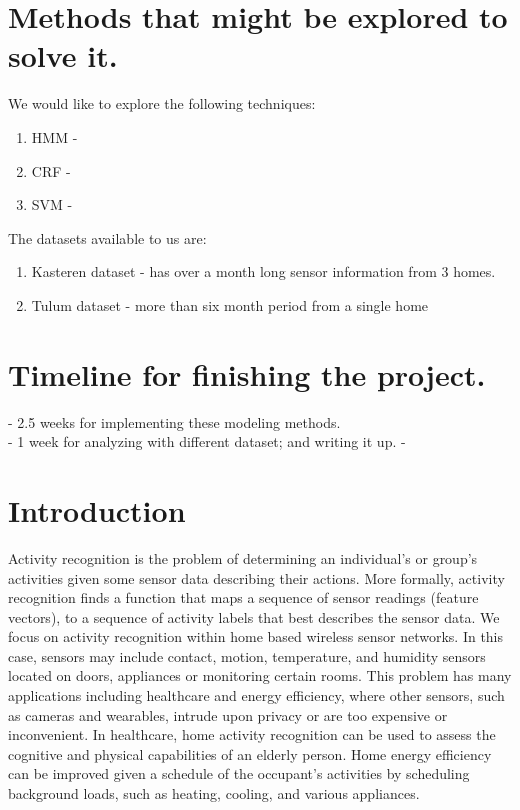 \documentclass[11pt, oneside]{article}   	%
\begin{document}
\section{Methods that might be explored to solve it. }
We would like to explore the following techniques:
	\begin{enumerate}
\item HMM - 
\item CRF - 
\item SVM - 
	\end{enumerate}
	
The datasets available to us are:
	\begin{enumerate}
\item Kasteren dataset - has over a month long sensor information from 3 homes.
\item Tulum dataset - more than six month period from a single home
	\end{enumerate}
\section{ Timeline for finishing the project. }
 - 2.5 weeks for implementing these modeling methods. \\
 - 1 week for analyzing with different dataset; and writing it up. 
 - 

\section{Introduction}
	Activity recognition is the problem of determining an individual's or group's activities given some sensor data describing their actions.
	More formally, activity recognition finds a function that maps a sequence of sensor readings (feature vectors), to a sequence of activity labels that best describes the sensor data.
	We focus on activity recognition within home based wireless sensor networks.
	In this case, sensors may include contact, motion, temperature, and humidity sensors located on doors, appliances or monitoring certain rooms.
	This problem has many applications including healthcare and energy efficiency, where other sensors, such as cameras and wearables, intrude upon privacy or are too expensive or inconvenient.
	In healthcare, home activity recognition can be used to assess the cognitive and physical capabilities of an elderly person.
	Home energy efficiency can be improved given a schedule of the occupant's activities by scheduling background loads, such as heating, cooling, and various appliances.
\end{document}
